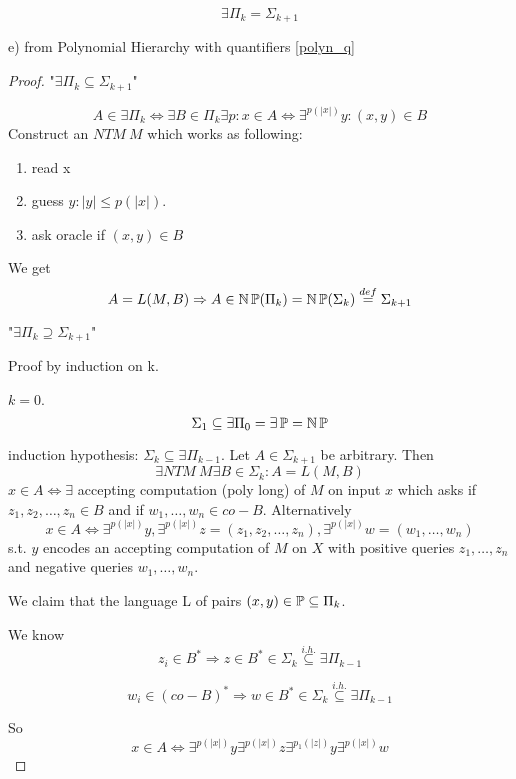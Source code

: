 \begin{theorem}
	\[ \exists \Pi_k = \Sigma_{k + 1} \]

	e) from Polynomial Hierarchy with quantifiers \cref{polyn_q}
\end{theorem}
\begin{proof}
	"$\exists \Pi_k \subseteq \Sigma_{k + 1}$"

	\[ A \in \exists \Pi_k \iff \exists B \in \Pi_k \exists p: x \in A \iff \exists^{p(|x|)} y: (x,y) \in B \]
	Construct an $NTM\ M$ which works as following:
	\begin{enumerate}
		\item read x
		\item guess $y: |y| \leq p(|x|)$.
		\item ask oracle if $(x,y) \in B$
	\end{enumerate}

	We get
	\[ A = L(M, B) \Rightarrow A \in \operatorname{\operatorname{\mathbb{N}}\mathbb{P}}(\Pi_k) = \operatorname{\operatorname{\mathbb{N}}\mathbb{P}}(\Sigma_k) \stackrel{def}{=} \Sigma_{k + 1} \]

	"$\exists \Pi_k \supseteq \Sigma_{k + 1}$"

	Proof by induction on k.

	$k = 0$.
	\[ \Sigma_1 \subseteq \exists \Pi_0 = \exists \operatorname{\mathbb{P}} = \operatorname{\operatorname{\mathbb{N}}\mathbb{P}} \]

	induction hypothesis: $\Sigma_k \subseteq \exists \Pi_{k - 1}$.
	Let $A \in \Sigma_{k + 1}$ be arbitrary.
	Then
	\[ \exists NTM\ M \exists B \in \Sigma_k: A = L(M, B) \]
	$x \in A \iff \exists$ accepting computation (poly long) of $M$ on input $x$ which asks if $z_1, z_2, \ldots, z_n \in B$ and if $w_1, \ldots, w_n \in co-B$.
	Alternatively
	\[ x \in A \iff \exists^{p(|x|)} y, \exists^{p(|x|)} z = (z_1, z_2, \ldots, z_n), \exists^{p(|x|)} w = (w_1, \ldots, w_n)\]
	s.t. $y$ encodes an accepting computation of $M$ on $X$ with positive queries $z_1, \ldots, z_n$ and negative queries $w_1, \ldots, w_n$.

	We claim that the language L of pairs $(x, y) \in \operatorname{\mathbb{P}} \subseteq \Pi_k$.

	We know
	\[ z_i \in B^{\ast} \Rightarrow z \in B^{\ast} \in \Sigma_k \stackrel{i.h.}{\subseteq} \exists \Pi_{k - 1}\]

	\[ w_i \in (co-B)^{\ast} \Rightarrow w \in B^{\ast} \in \Sigma_k \stackrel{i.h.}{\subseteq} \exists \Pi_{k - 1}\]

	So
	\[x \in A \iff \exists^{p(|x|)} y \exists^{p(|x|)} z \exists^{p_1(|z|)} y \exists^{p(|x|)} w\]
\end{proof}

